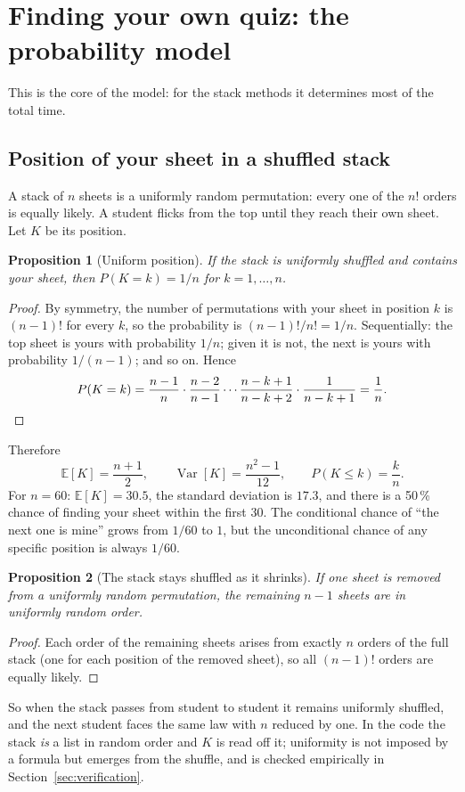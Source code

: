 \documentclass[11pt,a4paper]{article}
\newtheorem{proposition}{Proposition}
\newcommand{\E}{\mathbb{E}}
\newcommand{\Var}{\operatorname{Var}}
\begin{document}
\section{Finding your own quiz: the probability model}\label{sec:search}

This is the core of the model: for the stack methods it determines most of the total time.

\subsection{Position of your sheet in a shuffled stack}
A stack of $n$ sheets is a uniformly random permutation: every one of the $n!$ orders is equally likely. A student flicks from the top until they reach their own sheet. Let $K$ be its position.

\begin{proposition}[Uniform position]
If the stack is uniformly shuffled and contains your sheet, then $P(K=k) = 1/n$ for $k = 1,\dots,n$.
\end{proposition}
\begin{proof}
By symmetry, the number of permutations with your sheet in position $k$ is $(n-1)!$ for every $k$, so the probability is $(n-1)!/n! = 1/n$.
Sequentially: the top sheet is yours with probability $1/n$; given it is not, the next is yours with probability $1/(n-1)$; and so on. Hence
\[
P(K=k) = \frac{n-1}{n}\cdot\frac{n-2}{n-1}\cdots\frac{n-k+1}{n-k+2}\cdot\frac{1}{n-k+1} = \frac1n .\qedhere
\]
\end{proof}
Therefore
\[
\E[K] = \frac{n+1}{2},\qquad \Var[K] = \frac{n^2-1}{12},\qquad P(K\le k) = \frac{k}{n}.
\]
For $n=60$: $\E[K]=30.5$, the standard deviation is $17.3$, and there is a 50\,\% chance of finding your sheet within the first 30.
The conditional chance of ``the next one is mine'' grows from $1/60$ to $1$, but the unconditional chance of any specific position is always $1/60$.

\begin{proposition}[The stack stays shuffled as it shrinks]
If one sheet is removed from a uniformly random permutation, the remaining $n-1$ sheets are in uniformly random order.
\end{proposition}
\begin{proof}
Each order of the remaining sheets arises from exactly $n$ orders of the full stack (one for each position of the removed sheet), so all $(n-1)!$ orders are equally likely.
\end{proof}
So when the stack passes from student to student it remains uniformly shuffled, and the next student faces the same law with $n$ reduced by one.
In the code the stack \emph{is} a list in random order and $K$ is read off it; uniformity is not imposed by a formula but emerges from the shuffle, and is checked empirically in Section~\ref{sec:verification}.
\end{document}
